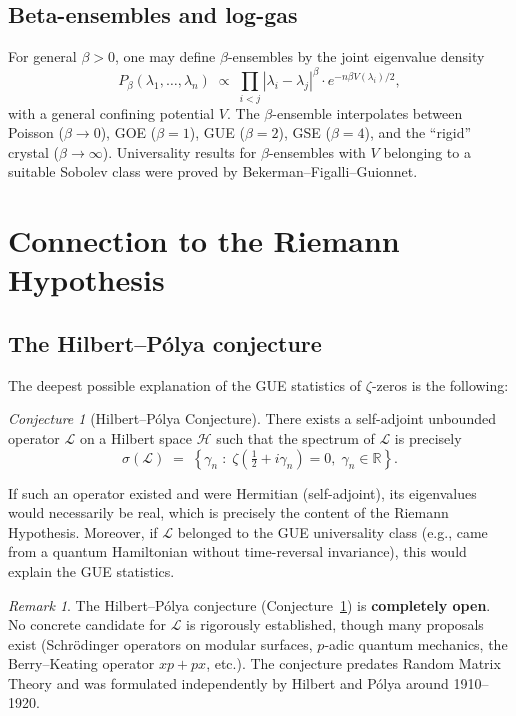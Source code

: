 \documentclass[12pt,a4paper]{amsart}
\theoremstyle{definition}
\theoremstyle{remark}
\newtheorem{remark}[theorem]{Remark}
\newtheorem{conjecture}[theorem]{Conjecture}
\begin{document}
\subsection{Beta-ensembles and log-gas}

For general $\beta > 0$, one may define $\beta$-ensembles by the
joint eigenvalue density
\[
  P_\beta(\lambda_1,\ldots,\lambda_n) \;\propto\;
  \prod_{i<j} |\lambda_i - \lambda_j|^\beta \cdot e^{-n\beta V(\lambda_i)/2},
\]
with a general confining potential $V$. The $\beta$-ensemble interpolates
between Poisson ($\beta \to 0$), GOE ($\beta=1$), GUE ($\beta=2$),
GSE ($\beta=4$), and the ``rigid'' crystal ($\beta \to \infty$).
Universality results for $\beta$-ensembles with $V$ belonging to a
suitable Sobolev class were proved by Bekerman--Figalli--Guionnet.

\section{Connection to the Riemann Hypothesis}
\label{sec:rh}

\subsection{The Hilbert--P\'olya conjecture}

The deepest possible explanation of the GUE statistics of $\zeta$-zeros
is the following:

\begin{conjecture}[Hilbert--P\'olya Conjecture]
\label{conj:hilbertpolya}
There exists a self-adjoint unbounded operator $\mathcal{L}$ on a Hilbert space
$\mathcal{H}$ such that the spectrum of $\mathcal{L}$ is precisely
\[
  \sigma(\mathcal{L}) \;=\; \left\{ \gamma_n \;:\; \zeta\!\left(\tfrac{1}{2} + i\gamma_n\right) = 0,\; \gamma_n \in \mathbb{R} \right\}.
\]
\end{conjecture}

\noindent
If such an operator existed and were Hermitian (self-adjoint), its eigenvalues
would necessarily be real, which is precisely the content of the Riemann
Hypothesis. Moreover, if $\mathcal{L}$ belonged to the GUE universality class
(e.g., came from a quantum Hamiltonian without time-reversal invariance),
this would explain the GUE statistics.

\begin{remark}
The Hilbert--P\'olya conjecture (Conjecture~\ref{conj:hilbertpolya}) is
\textbf{completely open}. No concrete candidate for $\mathcal{L}$ is
rigorously established, though many proposals exist (Schr\"odinger operators
on modular surfaces, $p$-adic quantum mechanics, the Berry--Keating operator
$xp + px$, etc.). The conjecture predates Random Matrix Theory and was
formulated independently by Hilbert and P\'olya around 1910--1920.
\end{remark}
\end{document}
